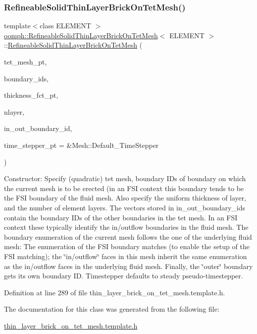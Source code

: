 \subsubsection{\texorpdfstring{Refineable\+Solid\+Thin\+Layer\+Brick\+On\+Tet\+Mesh()}{RefineableSolidThinLayerBrickOnTetMesh()}}
{\footnotesize\ttfamily template$<$class E\+L\+E\+M\+E\+NT $>$ \\
\hyperlink{classoomph_1_1RefineableSolidThinLayerBrickOnTetMesh}{oomph\+::\+Refineable\+Solid\+Thin\+Layer\+Brick\+On\+Tet\+Mesh}$<$ E\+L\+E\+M\+E\+NT $>$\+::\hyperlink{classoomph_1_1RefineableSolidThinLayerBrickOnTetMesh}{Refineable\+Solid\+Thin\+Layer\+Brick\+On\+Tet\+Mesh} (\begin{DoxyParamCaption}\item[{Mesh $\ast$}]{tet\+\_\+mesh\+\_\+pt,  }\item[{const Vector$<$ unsigned $>$ \&}]{boundary\+\_\+ids,  }\item[{\hyperlink{classoomph_1_1RefineableSolidThinLayerBrickOnTetMesh_a45af8cb1926cec40d597eb18b75b96da}{Thickness\+Fct\+Pt}}]{thickness\+\_\+fct\+\_\+pt,  }\item[{const unsigned \&}]{nlayer,  }\item[{const Vector$<$ Vector$<$ unsigned $>$ $>$ \&}]{in\+\_\+out\+\_\+boundary\+\_\+id,  }\item[{Time\+Stepper $\ast$}]{time\+\_\+stepper\+\_\+pt = {\ttfamily \&Mesh\+:\+:Default\+\_\+TimeStepper} }\end{DoxyParamCaption})\hspace{0.3cm}{\ttfamily [inline]}}



Constructor\+: Specify (quadratic) tet mesh, boundary I\+Ds of boundary on which the current mesh is to be erected (in an F\+SI context this boundary tends to be the F\+SI boundary of the fluid mesh. Also specify the uniform thickness of layer, and the number of element layers. The vectors stored in in\+\_\+out\+\_\+boundary\+\_\+ids contain the boundary I\+Ds of the other boundaries in the tet mesh. In an F\+SI context these typically identify the in/outflow boundaries in the fluid mesh. The boundary enumeration of the current mesh follows the one of the underlying fluid mesh\+: The enumeration of the F\+SI boundary matches (to enable the setup of the F\+SI matching); the \char`\"{}in/outflow\char`\"{} faces in this mesh inherit the same enumeration as the in/outflow faces in the underlying fluid mesh. Finally, the \char`\"{}outer\char`\"{} boundary gets its own boundary ID. Timestepper defaults to steady pseudo-\/timestepper. 



Definition at line 289 of file thin\+\_\+layer\+\_\+brick\+\_\+on\+\_\+tet\+\_\+mesh.\+template.\+h.



The documentation for this class was generated from the following file\+:\begin{DoxyCompactItemize}
\item 
\hyperlink{thin__layer__brick__on__tet__mesh_8template_8h}{thin\+\_\+layer\+\_\+brick\+\_\+on\+\_\+tet\+\_\+mesh.\+template.\+h}\end{DoxyCompactItemize}
